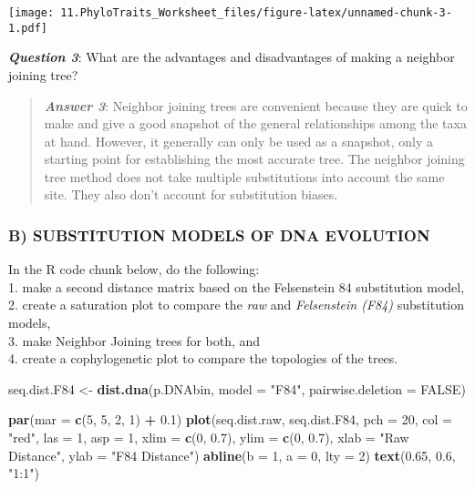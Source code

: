 \documentclass[]{article}
\newenvironment{Shaded}{\begin{snugshade}}{\end{snugshade}}
\newcommand{\KeywordTok}[1]{\textcolor[rgb]{0.13,0.29,0.53}{\textbf{#1}}}
\newcommand{\DataTypeTok}[1]{\textcolor[rgb]{0.13,0.29,0.53}{#1}}
\newcommand{\DecValTok}[1]{\textcolor[rgb]{0.00,0.00,0.81}{#1}}
\newcommand{\FloatTok}[1]{\textcolor[rgb]{0.00,0.00,0.81}{#1}}
\newcommand{\StringTok}[1]{\textcolor[rgb]{0.31,0.60,0.02}{#1}}
\newcommand{\OtherTok}[1]{\textcolor[rgb]{0.56,0.35,0.01}{#1}}
\newcommand{\OperatorTok}[1]{\textcolor[rgb]{0.81,0.36,0.00}{\textbf{#1}}}
\newcommand{\NormalTok}[1]{#1}
\begin{document}
\texttt{[image: 11.PhyloTraits\_Worksheet\_files/figure-latex/unnamed-chunk-3-1.pdf]}

\textbf{\emph{Question 3}}: What are the advantages and disadvantages of
making a neighbor joining tree?

\begin{quote}
\textbf{\emph{Answer 3}}: Neighbor joining trees are convenient because
they are quick to make and give a good snapshot of the general
relationships among the taxa at hand. However, it generally can only be
used as a snapshot, only a starting point for establishing the most
accurate tree. The neighbor joining tree method does not take multiple
substitutions into account the same site. They also don't account for
substitution biases.
\end{quote}

\subsubsection{B) SUBSTITUTION MODELS OF DNA
EVOLUTION}\label{b-substitution-models-of-dna-evolution}

In the R code chunk below, do the following:\\
1. make a second distance matrix based on the Felsenstein 84
substitution model,\\
2. create a saturation plot to compare the \emph{raw} and
\emph{Felsenstein (F84)} substitution models,\\
3. make Neighbor Joining trees for both, and\\
4. create a cophylogenetic plot to compare the topologies of the trees.

\begin{Shaded}
\begin{Highlighting}[]
\NormalTok{seq.dist.F84 <-}\StringTok{ }\KeywordTok{dist.dna}\NormalTok{(p.DNAbin, }\DataTypeTok{model =} \StringTok{"F84"}\NormalTok{, }\DataTypeTok{pairwise.deletion =} \OtherTok{FALSE}\NormalTok{)}

\KeywordTok{par}\NormalTok{(}\DataTypeTok{mar =} \KeywordTok{c}\NormalTok{(}\DecValTok{5}\NormalTok{, }\DecValTok{5}\NormalTok{, }\DecValTok{2}\NormalTok{, }\DecValTok{1}\NormalTok{) }\OperatorTok{+}\StringTok{ }\FloatTok{0.1}\NormalTok{)}
\KeywordTok{plot}\NormalTok{(seq.dist.raw, seq.dist.F84,}
     \DataTypeTok{pch =} \DecValTok{20}\NormalTok{, }\DataTypeTok{col =} \StringTok{"red"}\NormalTok{, }\DataTypeTok{las =} \DecValTok{1}\NormalTok{, }\DataTypeTok{asp =} \DecValTok{1}\NormalTok{, }\DataTypeTok{xlim =} \KeywordTok{c}\NormalTok{(}\DecValTok{0}\NormalTok{, }\FloatTok{0.7}\NormalTok{), }\DataTypeTok{ylim =} \KeywordTok{c}\NormalTok{(}\DecValTok{0}\NormalTok{, }\FloatTok{0.7}\NormalTok{), }
     \DataTypeTok{xlab =} \StringTok{"Raw Distance"}\NormalTok{, }\DataTypeTok{ylab =} \StringTok{"F84 Distance"}\NormalTok{) }
\KeywordTok{abline}\NormalTok{(}\DataTypeTok{b =} \DecValTok{1}\NormalTok{, }\DataTypeTok{a =} \DecValTok{0}\NormalTok{, }\DataTypeTok{lty =} \DecValTok{2}\NormalTok{)}
\KeywordTok{text}\NormalTok{(}\FloatTok{0.65}\NormalTok{, }\FloatTok{0.6}\NormalTok{, }\StringTok{"1:1"}\NormalTok{)}
\end{Highlighting}
\end{Shaded}
\end{document}
